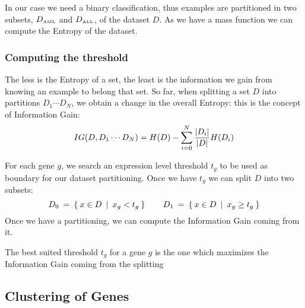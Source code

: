         In our case we need a binary classification, thus examples are
        partitioned in two subsets, $D_{\tiny{\mbox{AML}}}$ and
        $D_{\tiny{\mbox{ALL}}}$, of the dataset $D$. As we have a mass function
        we can compute the Entropy of the dataset.

    \subsubsection{ Computing the threshold }

        The less is the Entropy of a set, the least is the information we
        gain from knowing an example to belong that set. So far, when
        splitting a set $D$ into partitions $D_1 \cdots D_N$, we obtain a
        change in the overall Entropy: this is the concept of Information
        Gain:
        \[
        IG(D, D_1 \cdots D_N) =
            H(D) - \sum_{i = 0}^N \frac{ \left|{D_i}\right| }{ \left|{D}\right| } H(D_i)
        \]

        For each gene $g$, we search an expression level threshold $t_g$
        to be used as boundary for our dataset partitioning. Once we have
        $t_g$ we can split $D$ into two subsets:
        \[
        D_0 \:=\: \Set{ x \in D \:|\: x_g < t_g }
        \qquad
        D_1 \:=\: \Set{ x \in D \:|\: x_g \geq t_g }
        \]
        Once we have a partitioning, we can compute the Information Gain
        coming from it.

        The best suited threshold $t_g$ for a gene $g$ is the one which
        maximizes the Information Gain coming from the splitting

\subsection{ Clustering of Genes } \label{sub:Clustering}
